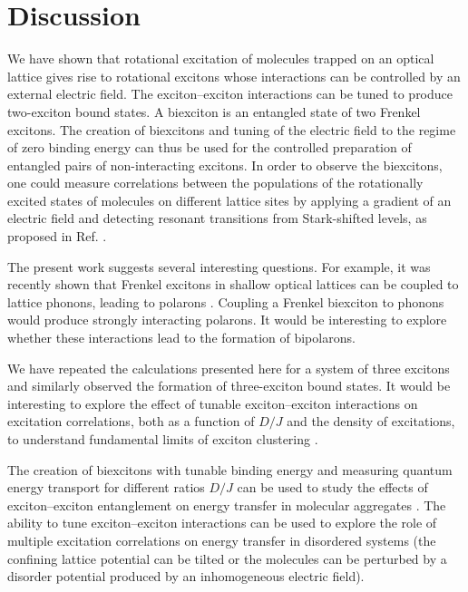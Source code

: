 \section{Discussion} 
We have shown that rotational excitation of molecules trapped on an optical lattice gives rise to rotational excitons
 whose interactions can be controlled by an external electric field. The exciton--exciton interactions can be tuned to
 produce two-exciton bound states.  A biexciton is an entangled state of two Frenkel excitons. The creation of
 biexcitons and tuning of the electric field to the regime of zero binding energy can
 thus be used for the controlled preparation of entangled pairs of non-interacting excitons. In order to observe the
 biexcitons, one could measure correlations between the populations of the rotationally excited states of molecules on
 different lattice sites  by applying a gradient of an electric field and detecting resonant transitions from Stark-shifted
 levels, as proposed in Ref. \cite{demille}.




The present work suggests several interesting questions. For example, it was recently shown that Frenkel excitons in
 shallow optical lattices can be coupled to lattice phonons, leading to polarons \cite{felipe-polarons}. Coupling a
 Frenkel biexciton to phonons would produce strongly interacting polarons. It would be interesting to explore whether these
 interactions lead to the formation of bipolarons. 



We have repeated the calculations presented here for a system of three excitons and similarly observed the formation
 of three-exciton bound states. It would be interesting to explore the effect of tunable exciton--exciton interactions
 on excitation correlations, both as a function of $D/J$ and the density of excitations, to understand fundamental
 limits of exciton clustering \cite{exciton-cluster}. 


The creation of biexcitons with tunable binding energy and measuring quantum energy transport for different ratios
 $D/J$ can be used to study the effects of exciton--exciton entanglement on energy transfer in molecular aggregates
 \cite{photosynthesis-1,photosynthesis-2,photosynthesis-3}. The ability to tune exciton--exciton interactions can be
 used to explore the role of multiple excitation correlations on energy transfer in disordered systems (the confining
 lattice potential can be tilted or the molecules can be perturbed by a disorder potential produced by an
 inhomogeneous electric field).
  



